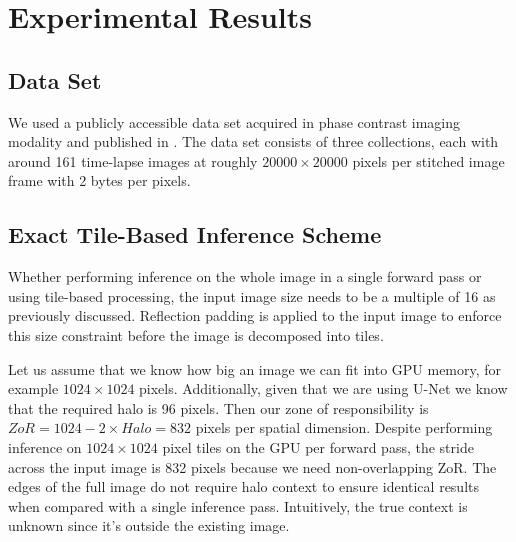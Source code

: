 \documentclass[twoside,11pt]{article}
\begin{document}
\section{Experimental Results}
\label{experimental-results}

\subsection{Data Set}
\label{dataset}

We used a publicly accessible data set acquired in phase contrast imaging modality and published in \citep{Bhadriraju2016}. 
The data set consists of three collections, each with around 161 time-lapse images at roughly $\num{20000} \times \num{20000}$  pixels per stitched image frame with 2 bytes per pixels. 


\subsection{Exact Tile-Based Inference Scheme}

Whether performing inference on the whole image in a single forward pass or using tile-based processing, the input image size needs to be a multiple of 16 as previously discussed. Reflection padding is applied to the input image to enforce this size constraint before the image is decomposed into tiles. 

Let us assume that we know how big an image we can fit into GPU memory, for example $1024 \times 1024$ pixels. Additionally, given that we are using U-Net we know that the required halo is 96 pixels. Then our zone of responsibility is $ZoR = 1024 - 2 \times Halo = 832$ pixels per spatial dimension. 
Despite performing inference on $1024 \times 1024$ pixel tiles on the GPU per forward pass, the stride across the input image is 832 pixels because we need non-overlapping ZoR. 
The edges of the full image do not require halo context to ensure identical results when compared with a single inference pass. Intuitively, the true context is unknown since it's outside the existing image.
\end{document}
